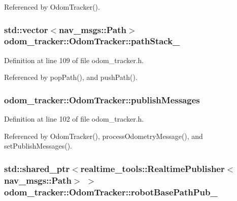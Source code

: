 Referenced by Odom\+Tracker().

\subsubsection[{\texorpdfstring{path\+Stack\+\_\+}{pathStack_}}]{\setlength{\rightskip}{0pt plus 5cm}std\+::vector$<$nav\+\_\+msgs\+::\+Path$>$ odom\+\_\+tracker\+::\+Odom\+Tracker\+::path\+Stack\+\_\+\hspace{0.3cm}{\ttfamily [protected]}}\hypertarget{classodom__tracker_1_1OdomTracker_a86188f3fcc8f7ce17e860cefb62d13fb}{}\label{classodom__tracker_1_1OdomTracker_a86188f3fcc8f7ce17e860cefb62d13fb}


Definition at line 109 of file odom\+\_\+tracker.\+h.



Referenced by pop\+Path(), and push\+Path().

\subsubsection[{\texorpdfstring{publish\+Messages}{publishMessages}}]{ odom\+\_\+tracker\+::\+Odom\+Tracker\+::publish\+Messages\hspace{0.3cm}{\ttfamily [protected]}}\hypertarget{classodom__tracker_1_1OdomTracker_a4d617a7bc17a7880a5ebee9697f827c0}{}\label{classodom__tracker_1_1OdomTracker_a4d617a7bc17a7880a5ebee9697f827c0}


Definition at line 102 of file odom\+\_\+tracker.\+h.



Referenced by Odom\+Tracker(), process\+Odometry\+Message(), and set\+Publish\+Messages().

\subsubsection[{\texorpdfstring{robot\+Base\+Path\+Pub\+\_\+}{robotBasePathPub_}}]{\setlength{\rightskip}{0pt plus 5cm}std\+::shared\+\_\+ptr$<$realtime\+\_\+tools\+::\+Realtime\+Publisher$<$nav\+\_\+msgs\+::\+Path$>$ $>$ odom\+\_\+tracker\+::\+Odom\+Tracker\+::robot\+Base\+Path\+Pub\+\_\+\hspace{0.3cm}{\ttfamily [protected]}}\hypertarget{classodom__tracker_1_1OdomTracker_a53e20a1b81ef82bf4c736d554e77a828}{}\label{classodom__tracker_1_1OdomTracker_a53e20a1b81ef82bf4c736d554e77a828}


